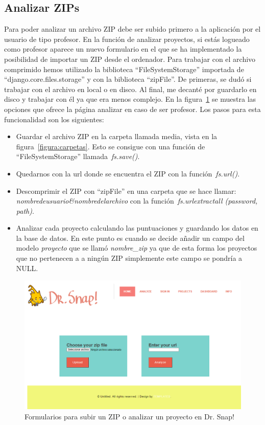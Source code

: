 \documentclass[a4paper, 12pt]{book}
\begin{document}
\subsection{Analizar ZIPs}
Para poder analizar un archivo ZIP debe ser subido primero a la aplicación por el usuario de tipo profesor. En la función de analizar proyectos, si estás logueado como profesor aparece un nuevo formulario en el que se ha implementado la posibilidad de importar un ZIP desde el ordenador. Para trabajar con el archivo comprimido hemos utilizado la biblioteca ``FileSystemStorage'' importada de ``django.core.files.storage'' y con la biblioteca ``zipFile''. De primeras, se dudó si trabajar con el archivo en local o en disco. Al final, me decanté por guardarlo en disco y trabajar con él ya que era menos complejo. En la figura~\ref{figura:zip} se muestra las opciones que ofrece la página analizar en caso de ser profesor. Los pasos para esta funcionalidad son los siguientes:
\begin{itemize}
    \item Guardar el archivo ZIP en la carpeta llamada media, vista en la figura~\ref{figura:carpetas}. Esto se consigue con una función de ``FileSystemStorage'' llamada~\textit{fs.save()}.
    \item Quedarnos con la url donde se encuentra el ZIP con la función~\textit{fs.url()}.
    \item Descomprimir el ZIP con ``zipFile'' en una carpeta que se hace llamar: \textit{nombredeusuario\&nombredelarchivo } con la función~\textit{fs.urlextractall (password, path)}.
    \item Analizar cada proyecto calculando las puntuaciones y guardando los datos en la base de datos. En este punto es cuando se decide añadir un campo del modelo \textit{proyecto} que se llamó \textit{nombre\_zip} ya que de esta forma los proyectos que no pertenecen a a ningún ZIP simplemente este campo se pondría a NULL.
\end{itemize}
\begin{figure}[h]
\centering
            \includegraphics[scale=0.5]{img/zip.PNG}
            \caption{Formularios para subir un ZIP o analizar un proyecto en Dr. Snap!}
            \label{figura:zip}
    \end{figure}
\end{document}

